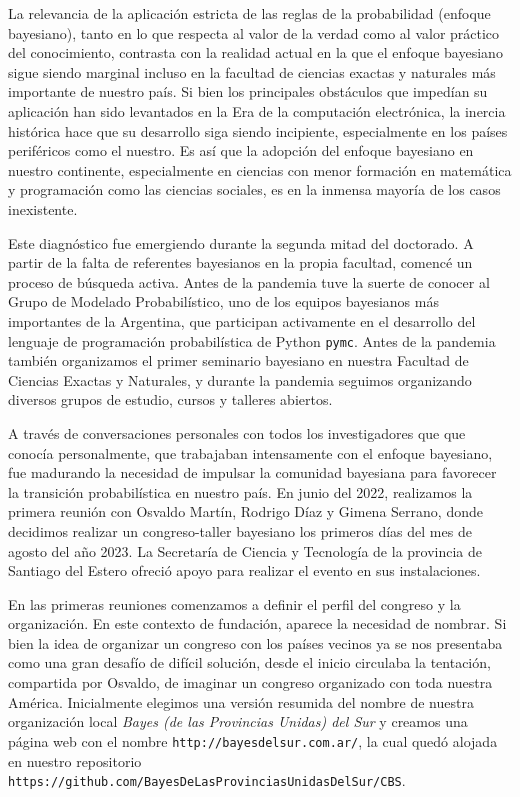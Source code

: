 \documentclass[a4paper,11pt]{book}
\theoremstyle{definition}
\begin{document}

La relevancia de la aplicación estricta de las reglas de la probabilidad (enfoque bayesiano), tanto en lo que respecta al valor de la verdad como al valor práctico del conocimiento, contrasta con la realidad actual en la que el enfoque bayesiano sigue siendo marginal incluso en la facultad de ciencias exactas y naturales más importante de nuestro país.
%
Si bien los principales obstáculos que impedían su aplicación han sido levantados en la Era de la computación electrónica, la inercia histórica hace que su desarrollo siga siendo incipiente, especialmente en los países periféricos como el nuestro.
%
Es así que la adopción del enfoque bayesiano en nuestro continente, especialmente en ciencias con menor formación en matemática y programación como las ciencias sociales, es en la inmensa mayoría de los casos inexistente.


Este diagnóstico fue emergiendo durante la segunda mitad del doctorado.
%
A partir de la falta de referentes bayesianos en la propia facultad, comencé un proceso de búsqueda activa.
%
Antes de la pandemia tuve la suerte de conocer al Grupo de Modelado Probabilístico, uno de los equipos bayesianos más importantes de la Argentina, que participan activamente en el desarrollo del lenguaje de programación probabilística de Python \texttt{pymc}.
%
Antes de la pandemia también organizamos el primer seminario bayesiano en nuestra Facultad de Ciencias Exactas y Naturales, y durante la pandemia seguimos organizando diversos grupos de estudio, cursos y talleres abiertos.


A través de conversaciones personales con todos los investigadores que que conocía personalmente, que trabajaban intensamente con el enfoque bayesiano, fue madurando la necesidad de impulsar la comunidad bayesiana para favorecer la transición probabilística en nuestro país.
%
En junio del 2022, realizamos la primera reunión con Osvaldo Martín, Rodrigo Díaz y Gimena Serrano, donde decidimos realizar un congreso-taller bayesiano los primeros días del mes de agosto del año 2023.
%
La Secretaría de Ciencia y Tecnología de la provincia de Santiago del Estero ofreció apoyo para realizar el evento en sus instalaciones.


En las primeras reuniones comenzamos a definir el perfil del congreso y la organización.
%
En este contexto de fundación, aparece la necesidad de nombrar.
%
Si bien la idea de organizar un congreso con los países vecinos ya se nos presentaba como una gran desafío de difícil solución, desde el inicio circulaba la tentación, compartida por Osvaldo, de imaginar un congreso organizado con toda nuestra América.
%
Inicialmente elegimos una versión resumida del nombre de nuestra organización local \emph{Bayes (de las Provincias Unidas) del Sur} y creamos una página web con el nombre \texttt{http://bayesdelsur.com.ar/}, la cual quedó alojada en nuestro repositorio \texttt{https://github.com/BayesDeLasProvinciasUnidasDelSur/CBS}.
\end{document}
